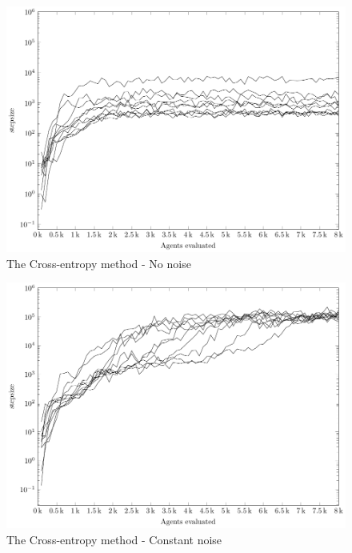 \clearpage
\begin{figure}[H]
\begin{center}
\includegraphics[scale=0.48]{plots/noNoisePlot}
\end{center}
\caption{The Cross-entropy method - No noise}
\end{figure}
\begin{figure}[H]
\begin{center}
\includegraphics[scale=0.48]{plots/constantNoisePlot}
\end{center}
\caption{The Cross-entropy method - Constant noise}
\end{figure}

